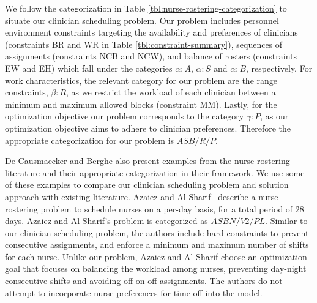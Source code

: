 
We follow the categorization in Table \ref{tbl:nurse-rostering-categorization} to situate our clinician
scheduling problem. Our problem includes 
personnel environment constraints targeting the availability and preferences of clinicians
(constraints BR and WR in Table \ref{tbl:constraint-summary}),
sequences of assignments (constraints NCB and NCW), and balance of rosters (constraints EW and EH) 
which fall under the categories $\alpha : A$, $\alpha : S$ and $\alpha : B$,  %
respectively. 
For work characteristics, the relevant category for our problem are the range
constraints, $\beta : R$, 
as we restrict the workload of each clinician between a minimum and maximum
allowed blocks (constraint MM).
Lastly, for the optimization objective our problem corresponds to the category
$\gamma : P$, as our optimization objective
aims to adhere to clinician preferences. Therefore the appropriate categorization
for our problem is $ASB/R/P$.

De Causmaecker and Berghe also present examples from the nurse rostering literature
and their appropriate categorization in their framework. We use some of these examples
to compare our clinician
scheduling problem and solution approach with existing literature. Azaiez and Al Sharif~\cite{azaiez_0-1_2005}
describe a nurse rostering problem to schedule nurses on a per-day basis, for a total period
of 28 days. Azaiez and Al Sharif's problem is categorized as $ASBN/V2/PL$.
Similar to our clinician scheduling problem, the authors include hard constraints
to prevent consecutive assignments, and enforce a minimum and maximum number of shifts for each nurse.
Unlike our problem, Azaiez and Al Sharif choose an optimization goal that focuses on
balancing the workload among nurses, preventing day-night consecutive shifts and 
avoiding off-on-off assignments. The authors do not attempt to incorporate nurse preferences
for time off into the model. 

